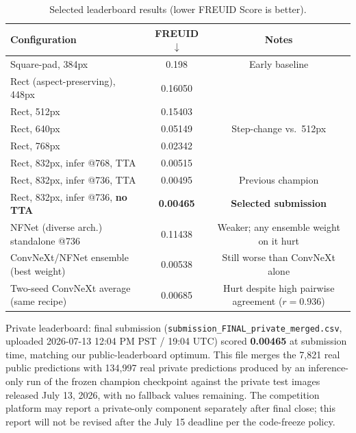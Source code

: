 \documentclass[11pt,a4paper]{article}
\begin{document}
\begin{table}[h]
  \centering
  \caption{Selected leaderboard results (lower FREUID Score is better).}
  \label{tab:results}
  \begin{tabular}{lcc}
    \toprule
    Configuration & FREUID $\downarrow$ & Notes \\
    \midrule
    Square-pad, 384px                          & 0.198    & Early baseline \\
    Rect (aspect-preserving), 448px             & 0.16050  & \\
    Rect, 512px                                 & 0.15403  & \\
    Rect, 640px                                 & 0.05149  & Step-change vs.\ 512px \\
    Rect, 768px                                 & 0.02342  & \\
    Rect, 832px, infer @768, TTA                & 0.00515  & \\
    Rect, 832px, infer @736, TTA                & 0.00495  & Previous champion \\
    Rect, 832px, infer @736, \textbf{no TTA}    & \textbf{0.00465} & \textbf{Selected submission} \\
    \midrule
    NFNet (diverse arch.) standalone @736       & 0.11438  & Weaker; any ensemble weight on it hurt \\
    ConvNeXt/NFNet ensemble (best weight)        & 0.00538  & Still worse than ConvNeXt alone \\
    Two-seed ConvNeXt average (same recipe)      & 0.00685  & Hurt despite high pairwise agreement ($r{=}0.936$) \\
    \bottomrule
  \end{tabular}
\end{table}

Private leaderboard: final submission (\texttt{submission\_FINAL\_private\_merged.csv},
uploaded 2026-07-13 12:04 PM PST / 19:04 UTC) scored \textbf{0.00465} at
submission time, matching our public-leaderboard optimum. This file merges
the 7{,}821 real public predictions with 134{,}997 real private predictions
produced by an inference-only run of the frozen champion checkpoint against
the private test images released July 13, 2026, with no fallback values
remaining. The competition platform may report a private-only component
separately after final close; this report will not be revised after the
July 15 deadline per the code-freeze policy.
\end{document}
